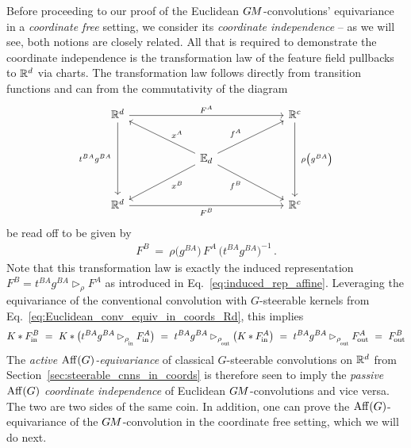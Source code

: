 Before proceeding to our proof of the Euclidean $G\mkern-1.4muM$-convolutions' equivariance in a \emph{coordinate free} setting, we consider its \emph{coordinate independence} -- as we will see, both notions are closely related.
All that is required to demonstrate the coordinate independence is the transformation law of the feature field pullbacks to $\mathbb{R}^d$ via charts.
The transformation law follows directly from transition functions and can from the commutativity of the diagram
\begin{equation}\label{cd:feature_field_chart_pullback_Rd_transitions}
    \begin{tikzcd}[row sep=2.5em, column sep=6em]
        \R^d
            \arrow[rr, "F^A"]
            \arrow[dd, "t^{BA} g^{BA}\ "']
        & &
        \R^c
            \arrow[dd, "\ \rho\big( g^{BA} \big)"]
        \\
        &
        \Euc_d
            \arrow[ul, pos=.4, "x^A"']
            \arrow[dl, pos=.4, "x^B"]
            \arrow[ur, pos=.4, "f^A"]
            \arrow[dr, pos=.4, "f^B"']
        \\
        \R^d
            \arrow[rr, "F^B"']
        & &
        \R^c
    \end{tikzcd}
\end{equation}
be read off to be given by
\begin{align}
    F^B\ =\ \rho\big( g^{BA} \big) \,F^A\, \big( t^{BA} g^{BA} \big)^{-1} \,.
\end{align}
Note that this transformation law is exactly the induced representation $F^B = t^{BA}g^{BA} \rhd_\rho F^A$ as introduced in Eq.~\eqref{eq:induced_rep_affine}.
Leveraging the equivariance of the conventional convolution with $G$-steerable kernels from Eq.~\eqref{eq:Euclidean_conv_equiv_in_coords_Rd}, this implies
\begin{align}\label{eq:Euclidean_conv_coordinate_independence}
    K*\Fin^B
    \ =\ K* \big( t^{BA} g^{BA} \rhd_{\rhoin} \Fin^A \big)
    \ =\ t^{BA} g^{BA} \rhd_{\rhoout} \big( K * \Fin^A \big)
    \ =\ t^{BA} g^{BA} \rhd_{\rhoout} \Fout^A
    \ =\ \Fout^B
\end{align}
The \emph{active $\operatorname{Aff}(G)$-equivariance} of classical $G$-steerable convolutions on $\mathbb{R}^d$ from Section~\ref{sec:steerable_cnns_in_coords} is therefore seen to imply the \emph{passive $\operatorname{Aff}(G)$ coordinate independence} of Euclidean $G\mkern-1.4muM$-convolutions and vice versa.
The two are two sides of the same coin.
In addition, one can prove the $\operatorname{Aff}(G)$-equivariance of the $G\mkern-1.4muM$-convolution in the coordinate free setting, which we will do next.




